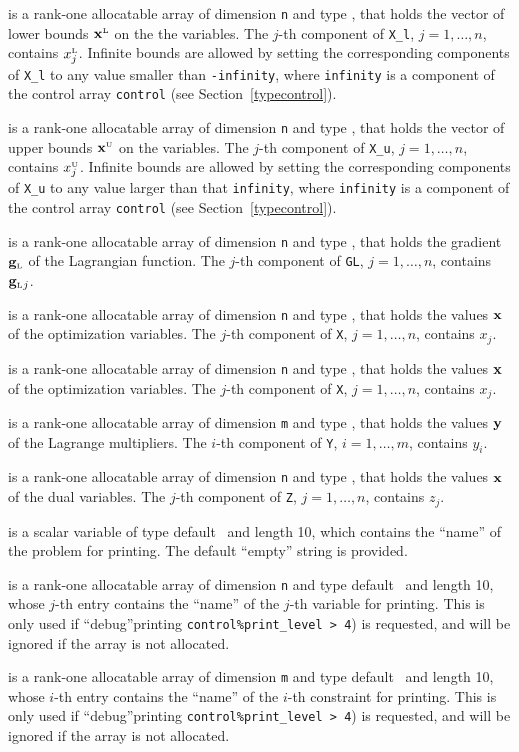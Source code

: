 \documentclass{galahad}
\newcommand{\sL}{\s{L}}
\newcommand{\sU}{\s{U}}
\newcommand{\bmgL}{\bmg\sub{L}}
\begin{document}
\begin{description}
 is a rank-one allocatable array of dimension {\tt n} and type
\realdp, that holds
the vector of lower bounds $\bmx\sL$ on the the variables.
The $j$-th component of {\tt X\_l}, $j = 1, \ldots , n$,
contains $x_{j}\sL$.
Infinite bounds are allowed by setting the corresponding
components of {\tt X\_l} to any value smaller than {\tt -infinity},
where {\tt infinity} is a component of the control array {\tt control}
(see Section~\ref{typecontrol}).

 is a rank-one allocatable array of dimension {\tt n} and type
\realdp, that holds
the vector of upper bounds $\bmx\sU$ on the variables.
The $j$-th component of {\tt X\_u}, $j = 1, \ldots , n$,
contains $x_{j}\sU$.
Infinite bounds are allowed by setting the corresponding
components of {\tt X\_u} to any value larger than that {\tt infinity},
where {\tt infinity} is a component of the control array {\tt control}
(see Section~\ref{typecontrol}).

 is a rank-one allocatable array of dimension {\tt n} and type
\realdp, that holds the gradient $\bmgL$ of the Lagrangian function.
The $j$-th component of {\tt GL}, $j = 1,  \ldots ,  n$, contains $\bmgL{}_{j}$.

 is a rank-one allocatable array of dimension {\tt n} and type
\realdp, that holds the values ${\mathbf{x}}$ of the optimization variables.
The $j$-th component of {\tt X}, $j = 1,  \ldots , n$, contains $x_{j}$.

 is a rank-one allocatable array of dimension {\tt n} and type
\realdp, that holds the values ${\mathbf{x}}$ of the optimization variables.
The $j$-th component of {\tt X}, $j = 1,  \ldots , n$, contains $x_{j}$.

 is a rank-one allocatable array of dimension {\tt m} and type
\realdp, that holds the values ${\mathbf{y}}$ of the Lagrange multipliers.
The $i$-th component of {\tt Y}, $i = 1,  \ldots , m$, contains $y_{i}$.

 is a rank-one allocatable array of dimension {\tt n} and type
\realdp, that holds the values ${\mathbf{x}}$ of the dual variables.
The $j$-th component of {\tt Z}, $j = 1,  \ldots , n$, contains $z_{j}$.

 is a scalar variable of type
default \character\ and length 10, which contains the
``name'' of the problem for printing. The default ``empty'' string is
provided.

 is a rank-one allocatable array of dimension {\tt n} and type
default \character\ and length 10, whose $j$-th entry contains the
``name'' of the $j$-th variable for printing. This is only used
if ``debug''printing {\tt control\%print\_level > 4}) is requested,
and will be ignored if the array is not allocated.

 is a rank-one allocatable array of dimension {\tt m} and type
default \character\ and length 10, whose $i$-th entry contains the
``name'' of the $i$-th constraint for printing. This is only used
if ``debug''printing {\tt control\%print\_level > 4}) is requested,
and will be ignored if the array is not allocated.

\end{description}
\end{document}
